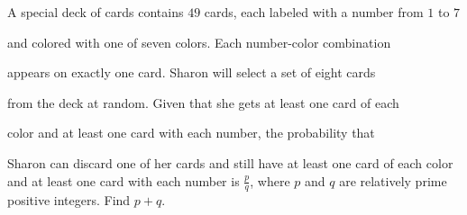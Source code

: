A special deck of cards contains $49$ cards, each labeled with a number from $1$ to $7$

 and colored with one of seven colors. Each number-color combination 

appears on exactly one card. Sharon will select a set of eight cards 

from the deck at random. Given that she gets at least one card of each 

color and at least one card with each number, the probability that 

Sharon can discard one of her cards and still have at least one card of each color and at least one card with each number is $\frac{p}{q}$,  where $p$ and $q$ are relatively prime positive integers. Find $p+q$.